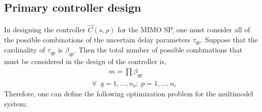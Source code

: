 \documentclass[default]{svmult}
\begin{document}
\subsection{Primary controller design}
In designing the controller $\vec{C}(s,\rho)$ for the MIMO SP, one must consider all of the possible combinations of the uncertain delay parameters $\tau_{qp}$.  Suppose that the cardinality of  $\tau_{qp}$ is $\beta_{qp}$. Then the total number of possible combinations that must be considered in the design of the controller is,
\begin{align}
&\hspace{1cm} m=\prod \beta_{qp} \nonumber \\
&\forall \;\; q=1,\ldots,n_o;\;p=1,\ldots,n_i
\end{align}
Therefore,  one can define the following optimization problem for the multimodel system:
\end{document}
